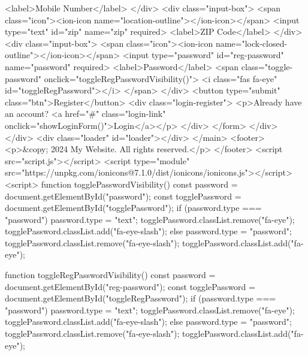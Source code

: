                         <label>Mobile Number</label>
                    </div>
                    <div class="input-box">
                        <span class="icon"><ion-icon name="location-outline"></ion-icon></span>
                        <input type="text" id="zip" name="zip" required>
                        <label>ZIP Code</label>
                    </div>
                    <div class="input-box">
                        <span class="icon"><ion-icon name="lock-closed-outline"></ion-icon></span>
                        <input type="password" id="reg-password" name="password" required>
                        <label>Password</label>
                        <span class="toggle-password" onclick="toggleRegPasswordVisibility()">
                            <i class="fas fa-eye" id="toggleRegPassword"></i>
                        </span>
                    </div>
                    <button type="submit" class="btn">Register</button>
                    <div class="login-register">
                        <p>Already have an account? <a href="#" class="login-link" onclick="showLoginForm()">Login</a></p>
                    </div>
                </form>
            </div>
        </div>
        <div class="loader" id="loader"></div>
    </main>
    <footer>
        <p>&copy; 2024 My Website. All rights reserved.</p>
    </footer>
    <script src="script.js"></script>
    <script type="module" src="https://unpkg.com/ionicons@7.1.0/dist/ionicons/ionicons.js"></script>
    <script>
        function togglePasswordVisibility() {
            const password = document.getElementById("password");
            const togglePassword = document.getElementById("togglePassword");
            if (password.type === "password") {
                password.type = "text";
                togglePassword.classList.remove("fa-eye");
                togglePassword.classList.add("fa-eye-slash");
            } else {
                password.type = "password";
                togglePassword.classList.remove("fa-eye-slash");
                togglePassword.classList.add("fa-eye");
            }
        }

        function toggleRegPasswordVisibility() {
            const password = document.getElementById("reg-password");
            const togglePassword = document.getElementById("toggleRegPassword");
            if (password.type === "password") {
                password.type = "text";
                togglePassword.classList.remove("fa-eye");
                togglePassword.classList.add("fa-eye-slash");
            } else {
                password.type = "password";
                togglePassword.classList.remove("fa-eye-slash");
                togglePassword.classList.add("fa-eye");
            }
        }

